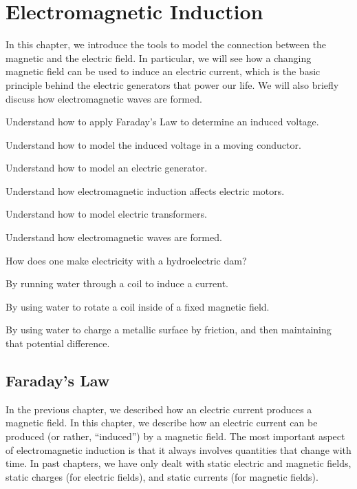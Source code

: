 \chapter{Electromagnetic Induction}
\label{chapter:induction}
In this chapter, we introduce the tools to model the connection between the magnetic and the electric field. In particular, we will see how a changing magnetic field can be used to induce an electric current, which is the basic principle behind the electric generators that power our life. We will also briefly discuss how electromagnetic waves are formed.

\begin{learningObjectives}{
 \item Understand how to apply Faraday's Law to determine an induced voltage.
 \item Understand how to model the induced voltage in a moving conductor.
 \item Understand how to model an electric generator.
 \item Understand how electromagnetic induction affects electric motors.
 \item Understand how to model electric transformers.
 \item Understand how electromagnetic waves are formed.
 }
\end{learningObjectives}

\begin{opening}
\begin{MCquestion}{How does one make electricity with a hydroelectric dam?}
\item By running water through a coil to induce a current.
\item By using water to rotate a coil inside of a fixed magnetic field. \correct
\item By using water to charge a metallic surface by friction, and then maintaining that potential difference.
\end{MCquestion}
\end{opening}

\section{Faraday's Law}
In the previous chapter, we described how an electric current produces a magnetic field. In this chapter, we describe how an electric current can be produced (or rather, ``induced'') by a magnetic field. The most important aspect of electromagnetic induction is that it always involves quantities that change with time. In past chapters, we have only dealt with static electric and magnetic fields, static charges (for electric fields), and static currents (for magnetic fields). 


